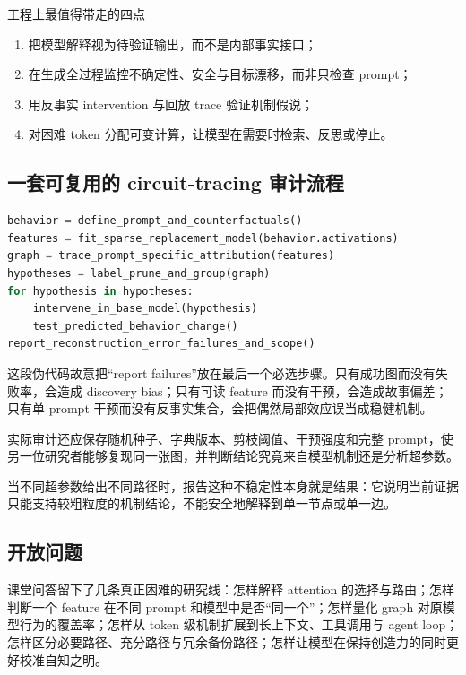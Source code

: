 \begin{importantbox}{工程上最值得带走的四点}
\begin{enumerate}
  \item 把模型解释视为待验证输出，而不是内部事实接口；
  \item 在生成全过程监控不确定性、安全与目标漂移，而非只检查 prompt；
  \item 用反事实 intervention 与回放 trace 验证机制假说；
  \item 对困难 token 分配可变计算，让模型在需要时检索、反思或停止。
\end{enumerate}
\end{importantbox}

\subsection{一套可复用的 circuit-tracing 审计流程}

\begin{lstlisting}[language=Python,caption={从行为问题到可证伪机制假说的审计流程}]
behavior = define_prompt_and_counterfactuals()
features = fit_sparse_replacement_model(behavior.activations)
graph = trace_prompt_specific_attribution(features)
hypotheses = label_prune_and_group(graph)
for hypothesis in hypotheses:
    intervene_in_base_model(hypothesis)
    test_predicted_behavior_change()
report_reconstruction_error_failures_and_scope()
\end{lstlisting}

这段伪代码故意把“report failures”放在最后一个必选步骤。只有成功图而没有失败率，会造成 discovery bias；只有可读 feature 而没有干预，会造成故事偏差；只有单 prompt 干预而没有反事实集合，会把偶然局部效应误当成稳健机制。

实际审计还应保存随机种子、字典版本、剪枝阈值、干预强度和完整 prompt，使另一位研究者能够复现同一张图，并判断结论究竟来自模型机制还是分析超参数。

当不同超参数给出不同路径时，报告这种不稳定性本身就是结果：它说明当前证据只能支持较粗粒度的机制结论，不能安全地解释到单一节点或单一边。

\subsection{开放问题}

课堂问答留下了几条真正困难的研究线：怎样解释 attention 的选择与路由；怎样判断一个 feature 在不同 prompt 和模型中是否“同一个”；怎样量化 graph 对原模型行为的覆盖率；怎样从 token 级机制扩展到长上下文、工具调用与 agent loop；怎样区分必要路径、充分路径与冗余备份路径；怎样让模型在保持创造力的同时更好校准自知之明。

